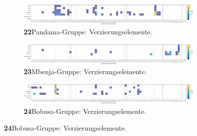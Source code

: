 \addtocounter{figure}{-1}
\begin{figure}

\begin{subfigure}{\textwidth}
	\setcounter{subfigure}{21}
	\centering
	\includegraphics[width=\textwidth]{fig/PDM_Verzierungselmente.pdf}
	\caption*{\textbf{22}\hspace{1em}Pandama-Gruppe: Verzierungselemente. \vspace{\baselineskip}}
	\label{fig:PDM_Verz}
\end{subfigure}

\begin{subfigure}{\textwidth}
	\centering
	\includegraphics[width=\textwidth]{fig/MBJ_Verzierungselmente.pdf}
	\caption*{\textbf{23}\hspace{1em}Mbenja-Gruppe: Verzierungselemente. \vspace{\baselineskip}}
	\label{fig:MBJ_Verz}
\end{subfigure}

\begin{subfigure}{\textwidth}
	\centering
	\includegraphics[width=\textwidth]{fig/BBS_Verzierungselmente.pdf}
	\caption*{\textbf{24}\hspace{1em}Bobusa-Gruppe: Verzierungselemente. \vspace{\baselineskip}}
	\label{fig:BBS_Verz}
\end{subfigure}
\end{figure}